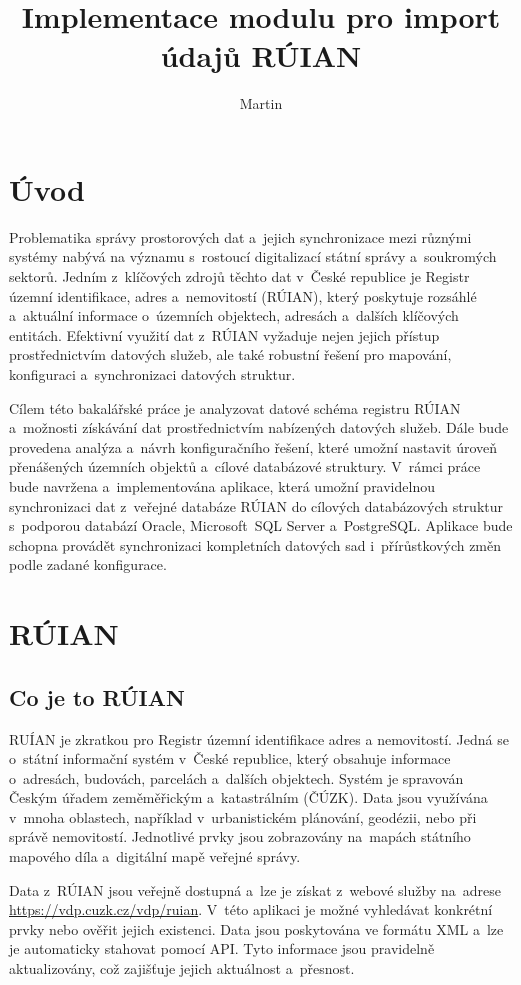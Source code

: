 \documentclass[czech, kiv, ba, he, iso690numb, pdf]{fasthesis}
\title{Implementace modulu pro import údajů RÚIAN}
\author{Martin}{Schön}{}{}
\begin{document}
\frontpages[tm]
\tableofcontents
\chapter{Úvod}
Problematika správy prostorových dat a~jejich synchronizace mezi různými systémy 
nabývá na významu s~rostoucí digitalizací státní správy a~soukromých sektorů. 
Jedním z~klíčových zdrojů těchto dat v~České republice je Registr územní identifikace, 
adres a~nemovitostí (RÚIAN), který poskytuje rozsáhlé a~aktuální informace o~územních 
objektech, adresách a~dalších klíčových entitách. Efektivní využití dat z~RÚIAN vyžaduje 
nejen jejich přístup prostřednictvím datových služeb, ale také robustní řešení pro mapování, 
konfiguraci a~synchronizaci datových struktur.

Cílem této bakalářské práce je analyzovat datové schéma registru RÚIAN a~možnosti získávání 
dat prostřednictvím nabízených datových služeb. Dále bude provedena analýza a~návrh konfiguračního 
řešení, které umožní nastavit úroveň přenášených územních objektů a~cílové databázové struktury. 
V~rámci práce bude navržena a~implementována aplikace, která umožní pravidelnou synchronizaci dat 
z~veřejné databáze RÚIAN do cílových databázových struktur s~podporou databází Oracle, 
Microsoft~SQL Server a~PostgreSQL. Aplikace bude schopna provádět synchronizaci kompletních datových 
sad i~přírůstkových změn podle zadané konfigurace.

\chapter{RÚIAN}
\section{Co je to RÚIAN}
RUÍAN je zkratkou pro Registr územní identifikace adres a nemovitostí. 
Jedná se o~státní informační systém v~České republice, který obsahuje 
informace o~adresách, budovách, parcelách a~dalších objektech. Systém 
je spravován Českým úřadem zeměměřickým a~katastrálním (ČÚZK). 
Data jsou využívána v~mnoha oblastech, například v~urbanistickém plánování, 
geodézii, nebo při správě nemovitostí. Jednotlivé prvky jsou zobrazovány na~mapách 
státního mapového díla a~digitální mapě veřejné správy. 

Data z~RÚIAN jsou veřejně dostupná a~lze je získat z~webové služby na~adrese 
\url{https://vdp.cuzk.cz/vdp/ruian}. V~této aplikaci je možné vyhledávat konkrétní 
prvky nebo ověřit jejich existenci. Data jsou poskytována ve formátu XML a~lze je 
automaticky stahovat pomocí API. Tyto informace jsou pravidelně aktualizovány, 
což zajišťuje jejich aktuálnost a~přesnost.
\end{document}

